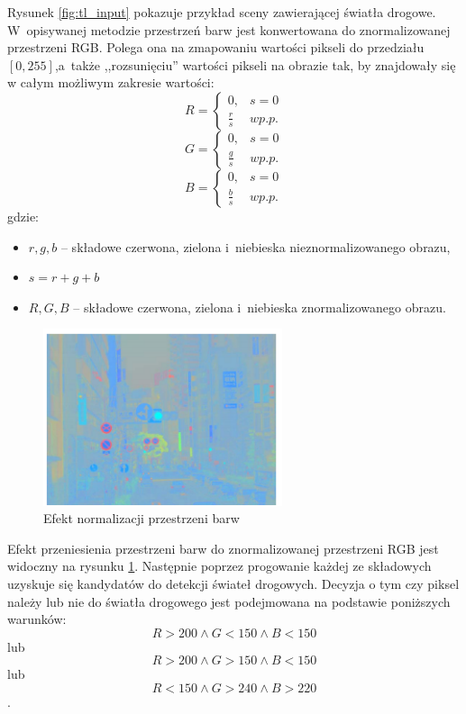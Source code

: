 Rysunek \ref{fig:tl_input} pokazuje przykład sceny zawierającej światła drogowe. 
W~opisywanej metodzie przestrzeń barw jest konwertowana do znormalizowanej przestrzeni RGB. 
Polega ona na zmapowaniu wartości pikseli do przedziału $[0,255]$,a~także ,,rozsunięciu'' wartości pikseli na obrazie tak, by znajdowały się w całym możliwym zakresie wartości:
\begin{equation}
R=\left\{\begin{matrix}
0, &  s=0\\
\frac{r}{s} & w p.p.
\end{matrix}\right.
\end{equation}
\begin{equation}
G=\left\{\begin{matrix}
0, &  s=0\\
\frac{g}{s} & w p.p.
\end{matrix}\right.
\end{equation}
\begin{equation}
B=\left\{\begin{matrix}
0, &  s=0\\
\frac{b}{s} & w p.p.
\end{matrix}\right.
\end{equation}
gdzie:
\begin{itemize}
\item$r,g,b$ -- składowe czerwona, zielona i~niebieska nieznormalizowanego obrazu,
\item$s = r+g+b$
\item$R,G,B$ -- składowe czerwona, zielona i~niebieska znormalizowanego obrazu.
\end{itemize}


\begin{figure}
  \centering
  \includegraphics[width=7cm]{img/tl_norm.png}
  \caption{Efekt normalizacji przestrzeni barw\cite{T4}}
  \label{fig:tl_norm}
\end{figure}

Efekt przeniesienia przestrzeni barw do znormalizowanej przestrzeni RGB jest widoczny na rysunku \ref{fig:tl_norm}.
Następnie poprzez progowanie każdej ze składowych uzyskuje się kandydatów do detekcji świateł drogowych. %
Decyzja o tym czy piksel należy lub nie do światła drogowego jest podejmowana na podstawie poniższych warunków:
\begin{equation}
R>200 \wedge G< 150 \wedge B<150
\end{equation}
lub
\begin{equation}
R>200 \wedge G> 150 \wedge B<150
\end{equation} 
lub
\begin{equation}
R<150 \wedge G>240 \wedge B>220
\end{equation}.

